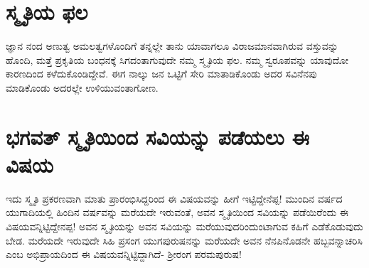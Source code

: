 \section*{ಸ್ಮೃತಿಯ ಫಲ}

ಜ್ಞಾನ ನಂದ ಅಣುತ್ವ ಅಮಲತ್ವಗಳೊಂದಿಗೆ ತನ್ನಲ್ಲೇ ತಾನು ಯಾವಾಗಲೂ ವಿರಾಜಮಾನವಾಗಿರುವ ವಸ್ತುವನ್ನು ಹೊಂದಿ, ಮತ್ತೆ ಪ್ರಕೃತಿಯ ಬಂಧನಕ್ಕೆ ಸಿಗದಂತಾಗುವುದೇ ನಮ್ಮ ಸ್ಮೃತಿಯ ಫಲ. ನಮ್ಮ ಸ್ವರೂಪವನ್ನು ಯಾವುದೋ ಕಾರಣದಿಂದ ಕಳೆದುಕೊಂಡಿದ್ದೇವೆ. ಈಗ ನಾಲ್ಕು ಜನ ಒಟ್ಟಿಗೆ ಸೇರಿ ಮಾತಾಡಿಕೊಂಡು ಅದರ ಸವಿನೆನಪು ಮಾಡಿಕೊಂಡು ಅದರಲ್ಲೇ ಉಳಿಯುವಂತಾಗೋಣ. 

\section*{ಭಗವತ್ ಸ್ಮೃತಿಯಿಂದ ಸವಿಯನ್ನು ಪಡೆಯಲು ಈ ವಿಷಯ}

ಇದು ಸ್ಮೃತಿ ಪ್ರಕರಣವಾಗಿ ಮಾತು ಪ್ರಾರಂಭಿಸಿದ್ದರಿಂದ ಈ ವಿಷಯವನ್ನು ಹೀಗೆ ಇಟ್ಟಿದ್ದೇನೆಪ್ಪ! ಮುಂದಿನ ವರ್ಷದ ಯುಗಾದಿಯಲ್ಲಿ ಹಿಂದಿನ ವರ್ಷವನ್ನು ಮರೆಯದೇ ಇರುವಂತೆ, ಅವನ ಸ್ಮೃತಿಯಿಂದ ಸವಿಯನ್ನು ಪಡೆಯಿರೆಂದು ಈ ವಿಷಯವನ್ನಿಟ್ಟಿದ್ದೇನಪ್ಪ! ಅವನ ಸ್ಮೃತಿಯನ್ನು ಅವನ ಸವಿಯನ್ನು ಮರೆಯುವುದರಿಂದುಂಟಾಗುವ ಕಹಿಗೆ ಎಡೆಕೊಡುವುದು ಬೇಡ. ಮರೆಯದೇ ಇರುವುದೇ ಸಿಹಿ ಪ್ರಸಂಗ ಯುಗಪುರುಷನನ್ನು ಮರೆಯದೇ ಅವನ ನೆನಪಿನೊಡನೇ ಹಬ್ಬವನ್ನಾಚರಿಸಿ ಎಂಬ ಅಭಿಪ್ರಾಯದಿಂದ ಈ ವಿಷಯವನ್ನಿಟ್ಟಿದ್ದಾಗಿದೆ- ಶ್ರೀರಂಗ ಪರಮಪುರುಷ!

